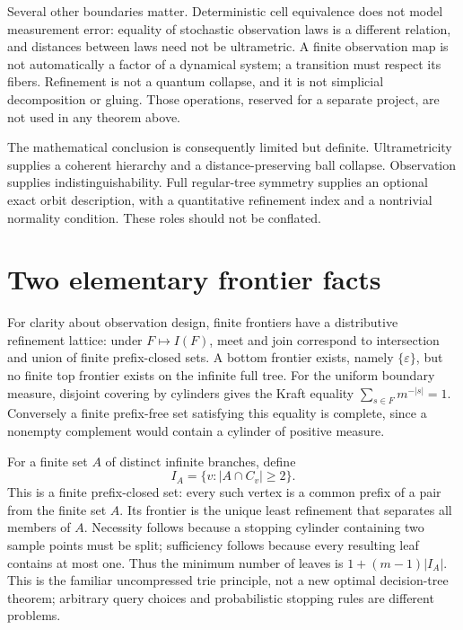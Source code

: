 \documentclass[11pt]{article}
\theoremstyle{definition}
\theoremstyle{remark}
\newcommand{\eps}{\varepsilon}
\begin{document}
Several other boundaries matter. Deterministic cell equivalence does not model measurement error: equality of stochastic observation laws is a different relation, and distances between laws need not be ultrametric. A finite observation map is not automatically a factor of a dynamical system; a transition must respect its fibers. Refinement is not a quantum collapse, and it is not simplicial decomposition or gluing. Those operations, reserved for a separate project, are not used in any theorem above.

The mathematical conclusion is consequently limited but definite. Ultrametricity supplies a coherent hierarchy and a distance-preserving ball collapse. Observation supplies indistinguishability. Full regular-tree symmetry supplies an optional exact orbit description, with a quantitative refinement index and a nontrivial normality condition. These roles should not be conflated.

\appendix
\section{Two elementary frontier facts}\label{sec:appendix}
For clarity about observation design, finite frontiers have a distributive refinement lattice: under $F\mapsto I(F)$, meet and join correspond to intersection and union of finite prefix-closed sets. A bottom frontier exists, namely $\{\eps\}$, but no finite top frontier exists on the infinite full tree. For the uniform boundary measure, disjoint covering by cylinders gives the Kraft equality
$\sum_{s\in F}m^{-|s|}=1$.
Conversely a finite prefix-free set satisfying this equality is complete, since a nonempty complement would contain a cylinder of positive measure.

For a finite set $A$ of distinct infinite branches, define
\[
 I_A=\{v:|A\cap C_v|\geq2\}.
\]
This is a finite prefix-closed set: every such vertex is a common prefix of a pair from the finite set $A$. Its frontier is the unique least refinement that separates all members of $A$. Necessity follows because a stopping cylinder containing two sample points must be split; sufficiency follows because every resulting leaf contains at most one. Thus the minimum number of leaves is $1+(m-1)|I_A|$. This is the familiar uncompressed trie principle, not a new optimal decision-tree theorem; arbitrary query choices and probabilistic stopping rules are different problems.

\printbibliography
\end{document}

